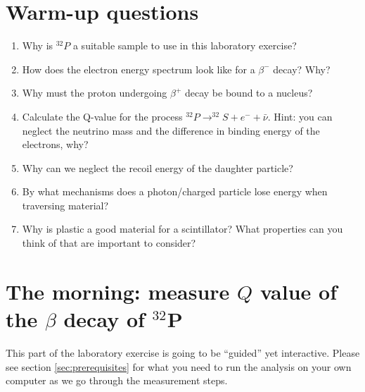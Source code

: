 \documentclass[a4,11pt, notitlepage]{article}
\begin{document}
\section{Warm-up questions}
\label{sec:warm-up-questions}

\begin{enumerate}
\item Why is $^{32}P$ a suitable sample to use in this laboratory exercise?
\item How does the electron energy spectrum look like for a $\beta^-$ decay? Why? 
\item Why must the proton undergoing $\beta^+$ decay be bound to a nucleus?
\item Calculate the Q-value for the process $^{32}P\rightarrow ^{32}S + e^- + \bar{\nu}$. Hint: you can neglect the neutrino mass and the difference in binding energy of the electrons, why? 
\item Why can we neglect the recoil energy of the daughter particle?
\item By what mechanisms does a photon/charged particle lose energy
  when traversing material?
\item Why is plastic a good material for a scintillator? What
  properties can you think of that are important to consider?
\end{enumerate}


\section{The morning: measure $Q$ value of the $\beta$ decay of $^{32}$P}
This part of the laboratory exercise is going to be ``guided'' yet
interactive. Please see section \ref{sec:prerequisites} for what you
need to run the analysis on your own computer as we go through the measurement steps.
\end{document}
